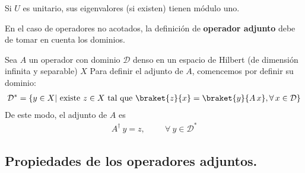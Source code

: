 \begin{lema}
Si $U$ es unitario, sus eigenvalores (si existen) tienen módulo uno.
\end{lema}
En el caso de operadores no acotados, la definición de \textbf{operador adjunto} debe de tomar en cuenta los dominios.
\par
Sea $A$ un operador con dominio $\mathcal{D}$ denso en un espacio de Hilbert (de dimensión infinita y separable) $X$ Para definir el adjunto de $A$, comencemos por definir su dominio:
\begin{align*} \mathcal{D}^{*} = \{ y \in X \vert \mbox{ existe } z \in X \mbox{ tal que } \braket{z}{x} = \braket{y}{A \, x}, \forall \, x \in \mathcal{D} \} \end{align*}
De este modo, el adjunto de $A$ es
\begin{align*} A^{\dagger} \: y = z, \hspace{1cm} \forall \: y \in \mathcal{D^{*}} \end{align*}

\subsection*{Propiedades de los operadores adjuntos.}

